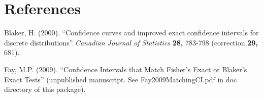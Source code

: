 \documentclass[12pt]{article}
\begin{document}
\section*{References}

\begin{description}
\item Blaker, H. (2000). ``Confidence curves and improved exact confidence intervals for discrete distributions''
{\it Canadian Journal of Statistics} {\bf 28,} 783-798 (correction {\bf 29,} 681).
\item Fay, M.P. (2009). ``Confidence Intervals that Match Fisher's Exact or Blaker's Exact Tests'' (unpublished manuscript. 
See Fay2009MatchingCI.pdf in doc 
directory of this package).
\end{description}
\end{document}
